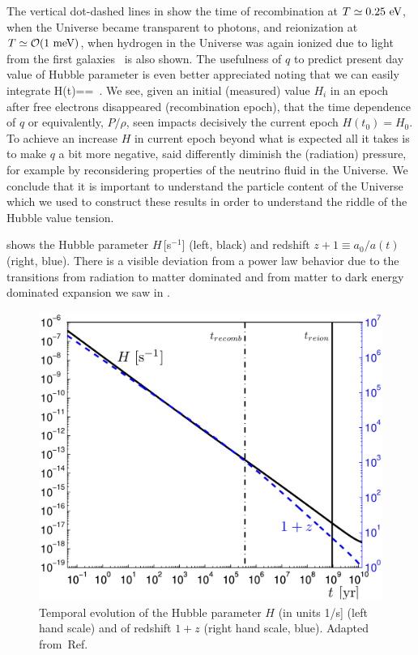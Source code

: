 {The vertical dot-dashed lines in  show the time of recombination at $T\simeq0.25\text{ eV}$, when the Universe became transparent to photons, and reionization at $T\simeq {\cal O}(1\meV)$, when hydrogen in the Universe was again ionized due to light from the first galaxies~\cite{Zaroubi:2012in} is also shown.  The usefulness of $q$ to predict present day value of Hubble parameter is even better appreciated noting that we can easily  integrate  
\beqn\label{eq:HdotInt}
H(t)==
\,.
\eeqn
We see, given an initial (measured) value $H_i$ in an epoch after free electrons disappeared (recombination epoch), that the time dependence of $q$ or equivalently, $P/\rho$, seen  impacts decisively the current epoch $H(t_0)=H_0$. To achieve an increase $H$ in current epoch beyond what is expected all it takes is to make $q$ a bit more negative, said differently diminish the (radiation) pressure, for example by reconsidering properties of the neutrino fluid in the Universe. We conclude that it is important to understand the particle content of the Universe which we used to construct these results in order to understand the riddle of the Hubble value tension.

 shows the Hubble parameter $H$\,[s$^{-1}$] (left, black) and redshift $z+1\equiv a_0/a(t)$ (right, blue).  There is a visible deviation from a power law behavior due to the transitions from radiation to matter dominated and from matter to dark energy dominated expansion we saw in .   

\begin{figure}
\centerline{\includegraphics[width=0.88\linewidth]{01-introduction/Figures/Hztoday.png}}
\caption{Temporal evolution of the Hubble parameter $H$ (in units 1/s] (left hand scale) and of redshift $1+z$ (right hand scale, blue). Adapted from~Ref.\,\cite{Rafelski:2013yka} 
\label{fig:today1} }
\end{figure}


}

